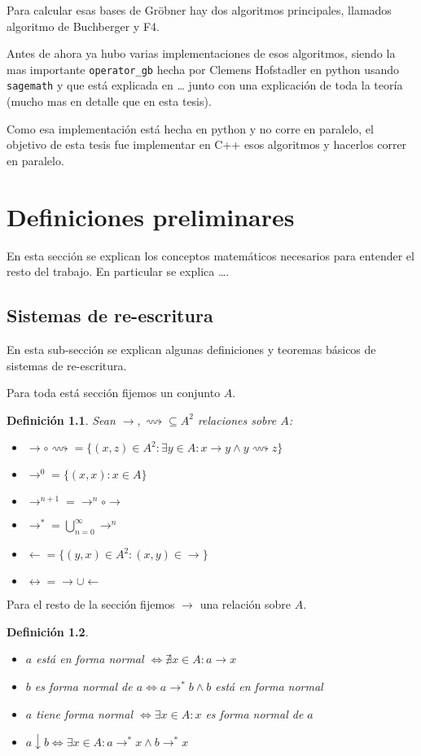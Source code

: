 \documentclass{amsbook} %
\theoremstyle{customstyle}
\newtheorem{definition}{Definición}[chapter]
\theoremstyle{factstyle}
\begin{document}
Para calcular esas bases de Gröbner hay dos algoritmos principales, llamados algoritmo de Buchberger y F4.

Antes de ahora ya hubo varias implementaciones de esos algoritmos, siendo la mas importante \texttt{operator\_gb} hecha por Clemens Hofstadler en python usando \texttt{sagemath} y que está explicada en … %
junto con una explicación de toda la teoría (mucho mas en detalle que en esta tesis).

Como esa implementación está hecha en python y no corre en paralelo, el objetivo de esta tesis fue implementar en C++ esos algoritmos y hacerlos correr en paralelo.

\chapter{Definiciones preliminares}

En esta sección se explican los conceptos matemáticos necesarios para entender el resto del trabajo.
En particular se explica …. %

\section{Sistemas de re-escritura}

En esta sub-sección se explican algunas definiciones y teoremas básicos de sistemas de re-escritura.

Para toda está sección fijemos un conjunto $A$.

\begin{definition} Sean $→, ⟿ ⊆ A^2$ relaciones sobre $A$:
\begin{itemize}
\item $→ ∘ ⟿ = \{(x, z) ∈ A^2 : ∃y ∈ A : x → y ∧ y ⟿ z\}$
\item $→^0 = \{(x, x) : x ∈ A\}$
\item $→^{n + 1} = →^n ∘ →$
\item $→^* = ⋃_{n = 0}^∞ →^n$
\item $← = \{(y, x) ∈ A^2 : (x, y) ∈ →\}$
\item $↔ = → ∪ ←$
\end{itemize}
\end{definition}

Para el resto de la sección fijemos $→$ una relación sobre $A$.

\begin{definition}\

\begin{itemize}
\item $a$ está en forma normal $⇔ ∄x ∈ A : a → x$
\item $b$ es forma normal de $a ⇔ a →^* b ∧ b$ está en forma normal
\item $a$ tiene forma normal $⇔ ∃x ∈ A : x$ es forma normal de $a$
\item $a ↓ b ⇔ ∃x ∈ A : a →^* x ∧ b →^* x$
\end{itemize}
\end{definition}
\end{document}
